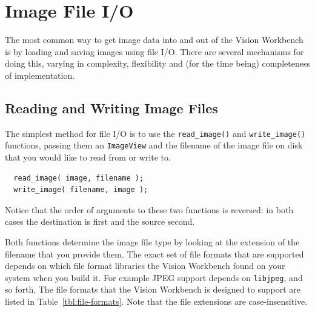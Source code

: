 \section{Image File I/O}

The most common way to get image data into and out of the Vision Workbench
is by loading and saving images using file I/O.  There are several mechanisms
for doing this, varying in complexity, flexibility and (for the time being)
completeness of implementation.

\subsection{Reading and Writing Image Files}

The simplest method for file I/O is to use the \verb#read_image()# and
\verb#write_image()# functions, passing them an \verb#ImageView# and
the filename of the image file on disk that you would like to read from
or write to.
\begin{verbatim}
  read_image( image, filename );
  write_image( filename, image );
\end{verbatim}
Notice that the order of arguments to these two functions is reversed:
in both cases the destination is first and the source second.

Both functions determine the image file type by looking at the
extension of the filename that you provide them.  The exact set of
file formats that are supported depends on which file format libraries
the Vision Workbench found on your system when you build it.  For
example JPEG support depends on \verb#libjpeg#, and so forth.  The
file formats that the Vision Workbench is designed to support are
listed in Table~\ref{tbl:file-formats}.  Note that the file extensions
are case-insensitive.

